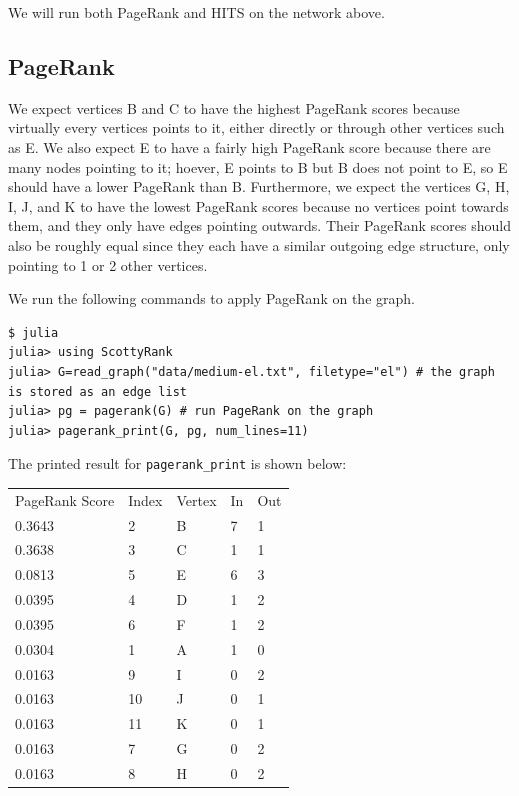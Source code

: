 \documentclass[12pt, titlepage, twoside]{amsart}
\begin{document}
We will run both PageRank and HITS on the network above.

\subsection{PageRank}

We expect vertices B and C to have the highest PageRank scores
because virtually every vertices points to it, either directly or through other vertices such as E.
We also expect E to have a fairly high PageRank score because there are many nodes pointing to it;
hoever, E points to B but B does not point to E, so E should have a lower PageRank than B.
Furthermore, we expect the vertices G, H, I, J, and K to have the lowest PageRank scores because
no vertices point towards them, and they only have edges pointing outwards.
Their PageRank scores should also be roughly equal since they each have a similar outgoing edge structure,
only pointing to 1 or 2 other vertices.

We run the following commands to apply PageRank on the graph.

\begin{verbatim}
$ julia
julia> using ScottyRank
julia> G=read_graph("data/medium-el.txt", filetype="el") # the graph is stored as an edge list
julia> pg = pagerank(G) # run PageRank on the graph
julia> pagerank_print(G, pg, num_lines=11)
\end{verbatim}

The printed result for \texttt{pagerank_print} is shown below:

\begin{table}[h]
\begin{tabular}{lllll}
PageRank Score & Index & Vertex & In & Out\\
    0.3643 &        2 &         B& 7 &         1 \\
    0.3638 &         3 &         C& 1 &         1 \\
    0.0813 &         5 &         E& 6 &         3 \\
    0.0395 &         4 &         D& 1 &         2 \\
    0.0395 &         6 &         F& 1 &         2 \\
    0.0304 &         1 &         A& 1 &         0 \\
    0.0163 &         9 &         I& 0 &         2 \\
    0.0163 &        10 &         J& 0 &         1 \\
    0.0163 &        11 &         K& 0 &         1 \\
    0.0163 &         7 &         G& 0 &         2 \\
    0.0163 &         8 &         H& 0 &          2\\
\end{tabular}
\end{table}
\end{document}
